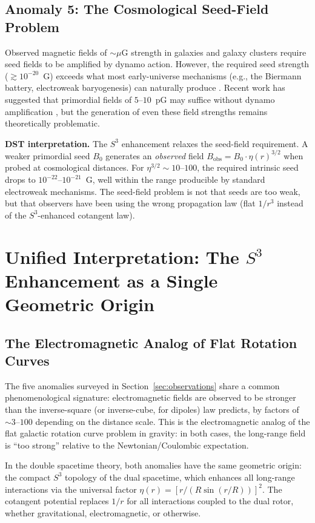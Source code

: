 \documentclass[a4paper]{article}
\begin{document}
\subsection{Anomaly 5: The Cosmological Seed-Field Problem}
\label{subsec:seed}

Observed magnetic fields of $\sim \mu$G strength in galaxies and galaxy clusters
require seed fields to be amplified by dynamo action. However, the required seed
strength ($\gtrsim 10^{-20}$~G) exceeds what most early-universe mechanisms
(e.g., the Biermann battery, electroweak baryogenesis) can naturally produce
\cite{widrow2002,durrer2013}. Recent work has suggested that primordial fields
of $5$--$10$~pG may suffice without dynamo amplification \cite{jedamzik2025},
but the generation of even these field strengths remains theoretically
problematic.

\textbf{DST interpretation.} The $S^3$ enhancement relaxes the seed-field
requirement. A weaker primordial seed $B_0$ generates an \emph{observed} field
$B_{\text{obs}} = B_0 \cdot \eta(r)^{3/2}$ when probed at cosmological
distances. For $\eta^{3/2} \sim 10$--$100$, the required intrinsic seed drops to
$10^{-22}$--$10^{-21}$~G, well within the range producible by standard
electroweak mechanisms. The seed-field problem is not that seeds are too weak,
but that observers have been using the wrong propagation law (flat $1/r^3$
instead of the $S^3$-enhanced cotangent law).

\section{Unified Interpretation: The $S^3$ Enhancement as a Single Geometric Origin}
\label{sec:interpretation}

\subsection{The Electromagnetic Analog of Flat Rotation Curves}

The five anomalies surveyed in Section~\ref{sec:observations} share a common
phenomenological signature: electromagnetic fields are observed to be stronger
than the inverse-square (or inverse-cube, for dipoles) law predicts, by factors
of $\sim 3$--$100$ depending on the distance scale. This is the electromagnetic
analog of the flat galactic rotation curve problem in gravity: in both cases,
the long-range field is ``too strong'' relative to the Newtonian/Coulombic
expectation.

In the double spacetime theory, both anomalies have the same geometric origin:
the compact $S^3$ topology of the dual spacetime, which enhances all long-range
interactions via the universal factor $\eta(r) = [r/(R\sin(r/R))]^2$. The
cotangent potential replaces $1/r$ for all interactions coupled to the dual
rotor, whether gravitational, electromagnetic, or otherwise.
\end{document}

